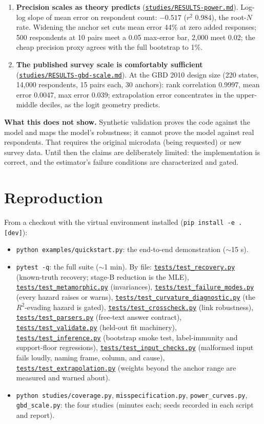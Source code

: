 \documentclass[11pt]{article}
\newcommand{\repo}{https://github.com/welfareweights/engine}
\newcommand{\src}[1]{\href{\repo/blob/main/#1}{\texttt{#1}}}
\begin{document}
\begin{enumerate}
\item \textbf{Precision scales as theory predicts} (\src{studies/RESULTS-power.md}). Log-log slope of mean error on respondent count: $-0.517$ ($r^2$ 0.984), the root-$N$ rate. Widening the anchor set cuts mean error 44\% at zero added responses; 500 respondents at 10 pairs meet a 0.05 max-error bar, 2{,}000 meet 0.02; the cheap precision proxy agrees with the full bootstrap to 1\%.
\item \textbf{The published survey scale is comfortably sufficient} (\src{studies/RESULTS-gbd-scale.md}). At the GBD 2010 design size (220 states, 14{,}000 respondents, 15 pairs each, 30 anchors): rank correlation 0.9997, mean error 0.0047, max error 0.039; extrapolation error concentrates in the upper-middle deciles, as the logit geometry predicts.
\end{enumerate}

\textbf{What this does not show.} Synthetic validation proves the code against the model and maps the model's robustness; it cannot prove the model against real respondents. That requires the original microdata (being requested) or new survey data. Until then the claims are deliberately limited: the implementation is correct, and the estimator's failure conditions are characterized and gated.

\section{Reproduction}\label{app:repro}

From a checkout with the virtual environment installed (\texttt{pip install -e .[dev]}):

\begin{itemize}
\item \texttt{python examples/quickstart.py}: the end-to-end demonstration ($\sim$15 s).
\item \texttt{pytest -q}: the full suite ($\sim$1 min). By file: \src{tests/test\_recovery.py} (known-truth recovery; stage-B reduction is the MLE), \src{tests/test\_metamorphic.py} (invariances), \src{tests/test\_failure\_modes.py} (every hazard raises or warns), \src{tests/test\_curvature\_diagnostic.py} (the $R^2$-evading hazard is gated), \src{tests/test\_crosscheck.py} (link robustness), \src{tests/test\_parsers.py} (free-text answer contract), \src{tests/test\_validate.py} (held-out fit machinery), \src{tests/test\_inference.py} (bootstrap smoke test, label-immunity and support-floor regressions), \src{tests/test\_input\_checks.py} (malformed input fails loudly, naming frame, column, and cause), \src{tests/test\_extrapolation.py} (weights beyond the anchor range are measured and warned about).
\item \texttt{python studies/coverage.py}, \texttt{misspecification.py}, \texttt{power\_curves.py}, \texttt{gbd\_scale.py}: the four studies (minutes each; seeds recorded in each script and report).
\end{itemize}
\end{document}
